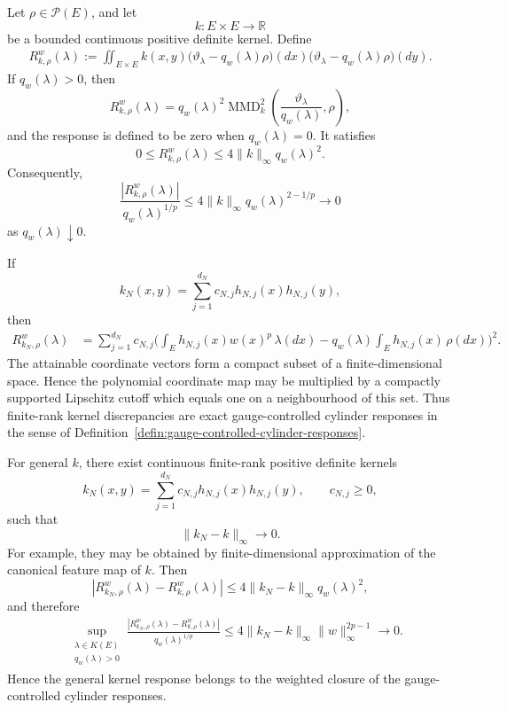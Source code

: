 \documentclass[a4paper,10pt]{article}
\begin{document}
Let \(\rho\in\mathcal P(E)\), and let
\[
        k:E\times E\longrightarrow\mathbb R
\]
be a bounded continuous positive definite kernel. Define
\[
\begin{aligned}
R_{k,\rho}^w(\lambda)
:=
\iint_{E\times E}
k(x,y)
\bigl(
\vartheta_\lambda-q_w(\lambda)\rho
\bigr)(dx)
\bigl(
\vartheta_\lambda-q_w(\lambda)\rho
\bigr)(dy).
\end{aligned}
\]
If \(q_w(\lambda)>0\), then
\[
R_{k,\rho}^w(\lambda)
=
q_w(\lambda)^2
\operatorname{MMD}_k^2
\left(
\frac{\vartheta_\lambda}{q_w(\lambda)},
\rho
\right),
\]
and the response is defined to be zero when \(q_w(\lambda)=0\).
It satisfies
\[
        0
        \le
        R_{k,\rho}^w(\lambda)
        \le
        4\lVert k\rVert_\infty q_w(\lambda)^2.
\]
Consequently,
\[
\frac{
        |R_{k,\rho}^w(\lambda)|
}{
        q_w(\lambda)^{1/p}
}
\le
4\lVert k\rVert_\infty
q_w(\lambda)^{2-1/p}
\longrightarrow0
\]
as \(q_w(\lambda)\downarrow0\).

If
\[
        k_N(x,y)
        =
        \sum_{j=1}^{d_N}c_{N,j}h_{N,j}(x)h_{N,j}(y),
\]
then
\[
\begin{aligned}
R_{k_N,\rho}^w(\lambda)
&=
\sum_{j=1}^{d_N}c_{N,j}
\Bigg(
\int_Eh_{N,j}(x)w(x)^p\,\lambda(dx)
-
q_w(\lambda)
\int_Eh_{N,j}(x)\,\rho(dx)
\Bigg)^2.
\end{aligned}
\]
The attainable coordinate vectors form a compact subset of a
finite-dimensional space. Hence the polynomial coordinate map may be
multiplied by a compactly supported Lipschitz cutoff which equals one
on a neighbourhood of this set. Thus finite-rank kernel discrepancies
are exact gauge-controlled cylinder responses in the sense of
Definition~\ref{defin:gauge-controlled-cylinder-responses}.

For general \(k\), there exist continuous finite-rank positive
definite kernels
\[
        k_N(x,y)
        =
        \sum_{j=1}^{d_N}
        c_{N,j}h_{N,j}(x)h_{N,j}(y),
        \qquad c_{N,j}\ge0,
\]
such that
\[
        \lVert k_N-k\rVert_\infty\longrightarrow0.
\]
For example, they may be obtained by finite-dimensional approximation
of the canonical feature map of \(k\).
Then
\[
\left|
R_{k_N,\rho}^w(\lambda)
-
R_{k,\rho}^w(\lambda)
\right|
\le
4\lVert k_N-k\rVert_\infty q_w(\lambda)^2,
\]
and therefore
\[
\begin{aligned}
&
\sup_{\substack{\lambda\in K(E)\\q_w(\lambda)>0}}
\frac{
\left|
R_{k_N,\rho}^w(\lambda)
-
R_{k,\rho}^w(\lambda)
\right|
}{
q_w(\lambda)^{1/p}
}
\le
4\lVert k_N-k\rVert_\infty
\lVert w\rVert_\infty^{2p-1}
\longrightarrow0.
\end{aligned}
\]
Hence the general kernel response belongs to the weighted closure of
the gauge-controlled cylinder responses.
\end{document}
